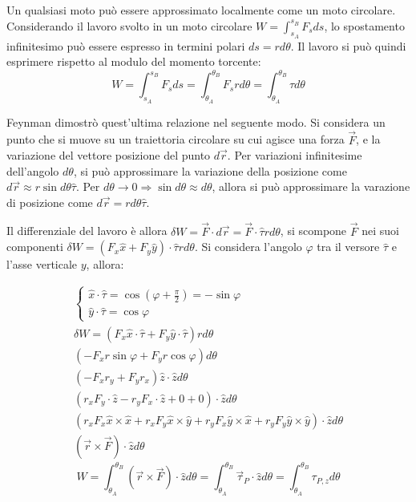\documentclass{article}
\numberwithin{equation}{subsection}
\begin{document}
Un qualsiasi moto può essere approssimato localmente come un moto circolare. Considerando il lavoro svolto in un moto circolare $W=\displaystyle\int_{s_A}^{s_B}{F}_s ds$, lo spostamento infinitesimo può essere espresso 
in termini polari $ds=rd\theta$. Il lavoro si può quindi esprimere rispetto al modulo del momento torcente: 
\begin{equation*}
    W=\displaystyle\int_{s_A}^{s_B}{F}_s ds=\int_{\theta_A}^{\theta_B}F_srd\theta=\int_{\theta_A}^{\theta_B}\tau d\theta
\end{equation*}




Feynman dimostrò quest'ultima relazione nel seguente modo. Si considera un punto che si 
muove su un traiettoria circolare su cui agisce una forza $\vec{F}$, 
e la variazione del vettore posizione del punto $d\vec{r}$. Per 
variazioni infinitesime dell'angolo $d\theta$, si può approssimare la variazione 
della posizione come $d\vec{r}\approx r\sin d\theta\hat{\tau}$. Per 
$d\theta\to 0\Rightarrow \sin d\theta\approx d\theta$, allora si può 
approssimare la varazione di posizione come $d\vec{r}=rd\theta\hat{\tau}$. 


Il differenziale del lavoro è allora $\delta W =\vec{F}\cdot d\vec{r}=\vec{F}\cdot\hat{\tau}rd\theta$, 
si scompone $\vec{F}$ nei suoi componenti $\delta W=(F_x\hat{x}+F_y\hat{y})\cdot\hat{\tau}rd\theta$. 
Si considera l'angolo $\varphi$ tra il versore $\hat{\tau}$ e l'asse 
verticale $y$, allora: 

\begin{gather*}
    \begin{cases}
        \displaystyle\hat{x}\cdot\hat{\tau}=\cos\left(\varphi+\displaystyle\frac{\pi}{2}\right)=-\sin\varphi\\
        \displaystyle\hat{y}\cdot\hat{\tau}=\cos\varphi
    \end{cases}\\
    \delta W =(F_x\hat{x}\cdot\hat{\tau}+F_y\hat{y}\cdot\hat{\tau})rd\theta\\
    (-F_xr\sin\varphi+F_yr\cos\varphi)d\theta\\
    (-F_xr_y+F_yr_x)\hat{z}\cdot\hat{z}d\theta\\
    (r_xF_y\cdot\hat{z}-r_yF_x\cdot\hat{z}+0+0)\cdot\hat{z}d\theta\\
    (r_xF_x\hat{x}\times\hat{x}+r_xF_y\hat{x}\times\hat{y}+r_yF_x\hat{y}\times\hat{x}+r_yF_y\hat{y}\times\hat{y})\cdot\hat{z}d\theta\\
    (\vec{r}\times\vec{F})\cdot\hat{z}d\theta
\end{gather*}
\begin{equation}
    W=\displaystyle\int_{\theta_A}^{\theta_B}(\vec{r}\times\vec{F})\cdot\hat{z}d\theta=\int_{\theta_A}^{\theta_B}\vec{\tau}_P\cdot\hat{z}d\theta=\int_{\theta_A}^{\theta_B}{\tau}_{P,z}d\theta
\end{equation}
\end{document}
